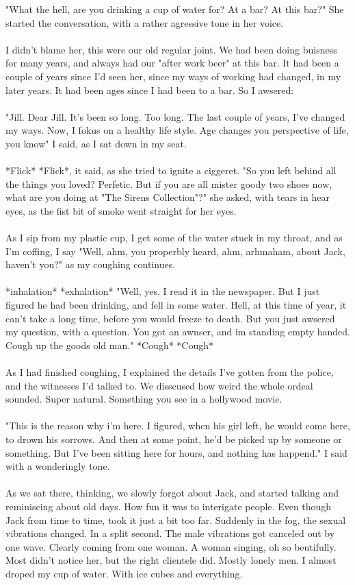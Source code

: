 \documentclass[]{article}
\begin{document}
"What the hell, are you drinking a cup of water for? At a bar? At this bar?" She started the conversation, with a rather agressive tone in her voice.
\\ \\
I didn't blame her, this were our old regular joint. We had been doing buisness for many years, and always had our "after work beer" at this bar. It had been a couple of years since I'd seen her, since my ways of working had changed, in my later years. It had been ages since I had been to a bar. So I awsered:
\\ \\
"Jill. Dear Jill. It's been so long. Too long. The last couple of years, I've changed my ways. Now, I fokus on a healthy life style. Age changes you perspective of life, you know" I said, as I sat down in my seat.
\\ \\
*Flick* *Flick*, it said, as she tried to ignite a ciggeret. "So you left behind all the things you loved? Perfetic. But if you are all mister goody two shoes now, what are you doing at "The Sirens Collection"?" she asked, with tears in hear eyes, as the fist bit of smoke went straight for her eyes.
\\ \\
As I sip from my plastic cup, I get some of the water stuck in my throat, and as I'm coffing, I say "Well, ahm, you properbly heard, ahm, arhmaham, about Jack, haven't you?" as my coughing continues.
\\ \\
*inhalation* *exhalation* "Well, yes. I read it in the newspaper. But I just figured he had been drinking, and fell in some water. Hell, at this time of year, it can't take a long time, before you would freeze to death. But you just awsered my question, with a question. You got an awnser, and im standing empty handed. Cough up the goods old man." *Cough* *Cough*
\\ \\
As I had finished coughing, I explained the details I've gotten from the police, and the witnesses I'd talked to. We disscused how weird the whole ordeal sounded. Super natural. Something you see in a hollywood movie.
\\ \\
"This is the reason why i'm here. I figured, when his girl left, he would come here, to drown his sorrows. And then at some point, he'd be picked up by someone or something. But I've been sitting here for hours, and nothing has happend." I said with a wonderingly tone. 
\\ \\
As we sat there, thinking, we slowly forgot about Jack, and started talking and reminiscing about old days. How fun it was to interigate people. Even though Jack from time to time, took it just a bit too far. Suddenly in the fog, the sexual vibrations changed. In a split second. The male vibrations got canceled out by one wave. Clearly coming from one woman. A woman singing, oh so beutifully. Most didn't notice her, but the right clientele did. Mostly lonely men. I almost droped my cup of water. With ice cubes and everything.
\end{document}
